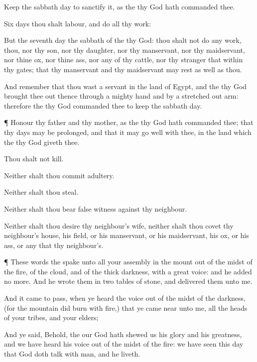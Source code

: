 {Keep the
sabbath
day to
sanctify it, as the
{} thy
God hath
commanded thee.

Six
days thou shalt
labour, and
do all thy
work:

But the
seventh
day
{} the
sabbath of the
{} thy
God:
{} thou shalt not
do any
work, thou, nor thy
son, nor thy
daughter, nor thy
manservant, nor thy
maidservant, nor thine
ox, nor thine
ass, nor any of thy
cattle, nor thy
stranger that
{} within thy
gates; that thy
manservant and thy
maidservant may
rest as well as thou.

And
remember that thou wast a
servant in the
land of
Egypt, and
{} the
{} thy
God
brought thee out thence through a
mighty
hand and by a stretched
out
arm: therefore the
{} thy
God
commanded thee to
keep the
sabbath
day.


\par }{\PP {}¶
Honour thy
father and thy
mother, as the
{} thy
God hath
commanded thee; that thy
days may be
prolonged, and that it may go
well with thee, in the
land which the
{} thy
God
giveth thee.

Thou shalt not
kill.

Neither shalt thou commit
adultery.

Neither shalt thou
steal.

Neither shalt thou
bear
false
witness against thy
neighbour.

Neither shalt thou
desire thy
neighbour’s
wife, neither shalt thou
covet thy
neighbour’s
house, his
field, or his
manservant, or his
maidservant, his
ox, or his
ass, or any
{} that
{} thy
neighbour’s.


\par }{\PP {}¶ These
words the
{}
spake unto all your
assembly in the
mount out of the
midst of the
fire, of the
cloud, and of the thick
darkness, with a
great
voice: and he added no
more. And he
wrote them in
two
tables of
stone, and
delivered them unto me.


\par }{\PP {}And it came to pass, when ye
heard the
voice out of the
midst of the
darkness, (for the
mountain did
burn with
fire,) that ye came
near unto me,
{} all the
heads of your
tribes, and your
elders;

And ye
said, Behold, the
{} our
God hath
shewed us his
glory and his
greatness, and we have
heard his
voice out of the
midst of the
fire: we have
seen this
day that
God doth
talk with
man, and he
liveth.

}
